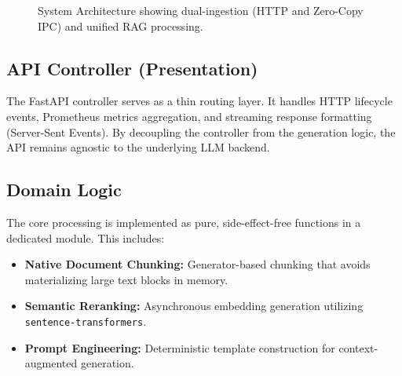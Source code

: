 \documentclass[10pt,twocolumn,letterpaper]{article}
\begin{document}
\begin{figure}[h]
\centering
{}
\caption{System Architecture showing dual-ingestion (HTTP and Zero-Copy IPC) and unified RAG processing.}
\label{fig:arch}
\end{figure}

\subsection{API Controller (Presentation)}
The FastAPI controller serves as a thin routing layer. It handles HTTP lifecycle events, Prometheus metrics aggregation, and streaming response formatting (Server-Sent Events). By decoupling the controller from the generation logic, the API remains agnostic to the underlying LLM backend.

\subsection{Domain Logic}
The core processing is implemented as pure, side-effect-free functions in a dedicated module. This includes:
\begin{itemize}
    \item \textbf{Native Document Chunking:} Generator-based chunking that avoids materializing large text blocks in memory.
    \item \textbf{Semantic Reranking:} Asynchronous embedding generation utilizing \texttt{sentence-transformers}.
    \item \textbf{Prompt Engineering:} Deterministic template construction for context-augmented generation.
\end{itemize}
\end{document}

